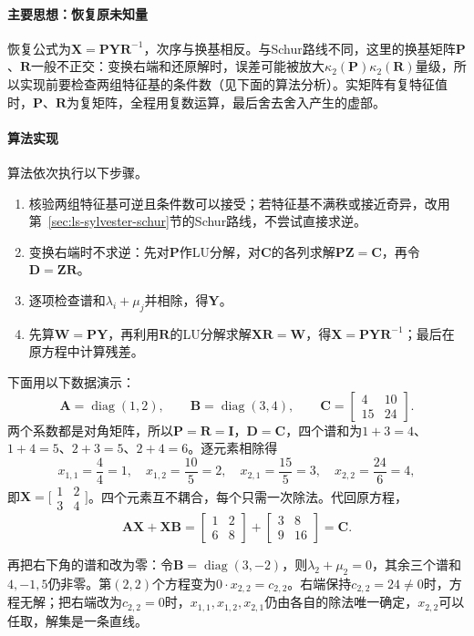 \paragraph{主要思想：恢复原未知量}
恢复公式为$\bm X=\bm P\bm Y\bm R^{-1}$，次序与换基相反。与Schur路线不同，这里的换基矩阵$\bm P$、$\bm R$一般不正交：变换右端和还原解时，误差可能被放大$\kappa_2(\bm P)\kappa_2(\bm R)$量级，所以实现前要检查两组特征基的条件数（见下面的算法分析）。实矩阵有复特征值时，$\bm P$、$\bm R$为复矩阵，全程用复数运算，最后舍去舍入产生的虚部。

\paragraph{算法实现}
算法依次执行以下步骤。
\begin{enumerate}
 \item 核验两组特征基可逆且条件数可以接受；若特征基不满秩或接近奇异，改用第~\ref{sec:ls-sylvester-schur}节的Schur路线，不尝试直接求逆。
 \item 变换右端时不求逆：先对$\bm P$作LU分解，对$\bm C$的各列求解$\bm P\bm Z=\bm C$，再令$\bm D=\bm Z\bm R$。
 \item 逐项检查谱和$\lambda_i+\mu_j$并相除，得$\bm Y$。
 \item 先算$\bm W=\bm P\bm Y$，再利用$\bm R$的LU分解求解$\bm X\bm R=\bm W$，得$\bm X=\bm P\bm Y\bm R^{-1}$；最后在原方程中计算残差。
\end{enumerate}

\begin{example}[对角系数下的逐元素相除与零谱和]
\label{ex:ls-sylvester-diagonal-zero-sum}
下面用以下数据演示：
\[
 \bm A=\operatorname{diag}(1,2),\qquad \bm B=\operatorname{diag}(3,4),\qquad
 \bm C=\begin{bmatrix}4&10\\15&24\end{bmatrix}.
\]
两个系数都是对角矩阵，所以$\bm P=\bm R=\bm I$，$\bm D=\bm C$，四个谱和为$1+3=4$、$1+4=5$、$2+3=5$、$2+4=6$。逐元素相除得
\[
 x_{1,1}=\frac44=1,\quad x_{1,2}=\frac{10}5=2,\quad
 x_{2,1}=\frac{15}5=3,\quad x_{2,2}=\frac{24}6=4,
\]
即$\bm X=\bigl[\begin{smallmatrix}1&2\\3&4\end{smallmatrix}\bigr]$。四个元素互不耦合，每个只需一次除法。代回原方程，
\[
 \bm A\bm X+\bm X\bm B
 =\begin{bmatrix}1&2\\6&8\end{bmatrix}+\begin{bmatrix}3&8\\9&16\end{bmatrix}
 =\bm C .
\]

再把右下角的谱和改为零：令$\bm B=\operatorname{diag}(3,-2)$，则$\lambda_2+\mu_2=0$，其余三个谱和$4,-1,5$仍非零。第$(2,2)$个方程变为$0\cdot x_{2,2}=c_{2,2}$。右端保持$c_{2,2}=24\neq0$时，方程无解；把右端改为$c_{2,2}=0$时，$x_{1,1},x_{1,2},x_{2,1}$仍由各自的除法唯一确定，$x_{2,2}$可以任取，解集是一条直线。
\end{example}

